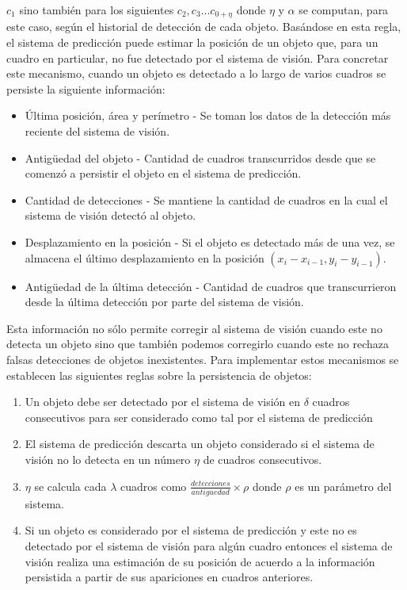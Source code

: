 $c_1$ sino también para los siguientes $c_2,c_3 ... c_{0+\eta}$ donde 
$\eta$ y $\alpha$ se computan, para este caso, según el 
historial de detección de cada objeto.  Basándose en esta regla, el 
sistema de predicción puede estimar la posición de un objeto que, 
para un cuadro en particular, no fue detectado por el sistema de 
visión. Para concretar este mecanismo, cuando un objeto es detectado a lo largo de varios cuadros se persiste la siguiente información:
\begin{itemize}
\item{ Última posición, área y perímetro - Se toman los datos de la 
detección más reciente del sistema de visión.}
\item{ Antigüedad del objeto - Cantidad de cuadros transcurridos desde que se comenzó a persistir el objeto en el sistema de predicción.}
\item{ Cantidad de detecciones - Se mantiene la cantidad de cuadros en la cual el sistema de visión detectó al objeto.}
\item{ Desplazamiento en la posición - Si el objeto es detectado más 
de una vez, se almacena el último desplazamiento en la posición $(x_i - 
x_{i-1} , y_i - y_{i-1} )$.}
\item{ Antigüedad de la última detección - Cantidad de cuadros que transcurrieron desde la última detección por parte del sistema de visión.}  
\end{itemize}
Esta información no sólo permite corregir al sistema de visión 
cuando este no detecta un objeto sino que también podemos corregirlo 
cuando este no rechaza falsas detecciones de objetos inexistentes. Para 
implementar estos mecanismos se establecen las siguientes reglas sobre 
la persistencia de objetos:
\begin{enumerate}
\item{Un objeto debe ser detectado por el sistema de visión en $\delta$ 
cuadros consecutivos para ser considerado como tal por el sistema de 
predicción}
\item{El sistema de predicción descarta un objeto considerado si el 
sistema de visión no lo detecta en un número $\eta$ de cuadros 
consecutivos.}
\item{ $\eta$ se calcula cada $\lambda$ cuadros como 
$\frac{detecciones}{antiguedad}\times \rho$ donde $\rho$ es un parámetro del 
sistema}.
\item{ Si un objeto es considerado por el sistema de predicción y este 
no es detectado por el sistema de visión para algún cuadro entonces 
el sistema de visión realiza una estimación de su posición de 
acuerdo a la información persistida a partir de sus apariciones en cuadros anteriores.}
\end{enumerate}

